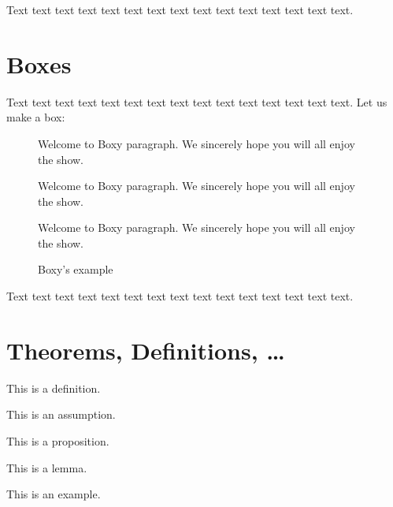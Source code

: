 Text text text text text text text text text text text text text text text.


\section{Boxes}
Text text text text text text text text text text text text text text text. Let us make a box:

\begin{figure}[!htbp]
\begin{center}
\caption{Boxy's example}\label{box:values}
\begin{boxeditemize}
	\item Welcome to Boxy paragraph. 
We sincerely hope you will
all enjoy the show.
	\item
Welcome to Boxy paragraph.
We sincerely hope you will
all enjoy the show.
	\item 
Welcome to Boxy paragraph.
We sincerely hope you will
all enjoy the show.
\end{boxeditemize}
\end{center}
\begin{source}\cite{Haaparanta1996}\end{source}
\end{figure}

Text text text text text text text text text text text text text text text.

\section{Theorems, Definitions, \ldots}

\begin{defin}\label{de:definice1}
This is a definition.
\end{defin}

\begin{ass}\label{as:predpoklad1}
This is an assumption.
\end{ass}

\begin{prop}\label{pr:veta1}
This is a proposition.
\end{prop}

\begin{lemma}\label{le:lemma1}
This is a lemma.
\end{lemma}

\begin{exam}\label{ex:priklad1}
This is an example.
\end{exam}

